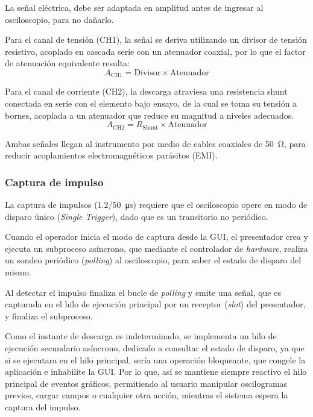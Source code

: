 La señal eléctrica, debe ser adaptada en amplitud antes de ingresar al osciloscopio, para no dañarlo.

Para el canal de tensión (CH1), la señal se deriva utilizando un divisor de tensión resistivo, acoplado en cascada serie con un atenuador coaxial, por lo que el factor de atenuación equivalente resulta:
\begin{equation}
    A_{\text{CH1}} = \text{Divisor} \times \text{Atenuador}
    \label{eq:atenuacion_tension}
\end{equation}

Para el canal de corriente (CH2), la descarga atraviesa una resistencia shunt conectada en serie con el elemento bajo ensayo, de la cual se toma su tensión a bornes, acoplada a un atenuador que reduce su magnitud a niveles adecuados.
\begin{equation}
    A_{\text{CH2}} = R_\text{Shunt} \times \text{Atenuador}
    \label{eq:atenuacion_corriente}
\end{equation}

Ambas señales llegan al instrumento por medio de cables coaxiales de \qty{50}{\ohm}, para reducir acoplamientos electromagnéticos parásitos (EMI).

\subsubsection{Captura de impulso}
\label{subsec:captura_impulso}

La captura de impulsos (\qty[parse-numbers=false]{1.2/50}{\micro\second}) requiere que el osciloscopio opere en modo de disparo único (\emph{Single Trigger}), dado que es un transitorio no periódico.

Cuando el operador inicia el modo de captura desde la GUI, el presentador crea y ejecuta un subproceso asíncrono, que mediante el controlador de \emph{hardware}, realiza un sondeo periódico (\emph{polling}) al osciloscopio, para saber el estado de disparo del mismo.

Al detectar el impulso finaliza el bucle de \emph{polling} y emite una señal, que es capturada en el hilo de ejecución principal por un receptor (\emph{slot}) del presentador, y finaliza el subproceso.

Como el instante de descarga es indeterminado, se implementa un hilo de ejecución secundario asíncrono, dedicado a consultar el estado de disparo, ya que si se ejecutara en el hilo principal, sería una operación bloqueante, que congele la aplicación e inhabilite la GUI. Por lo que, así se mantiene siempre reactivo el hilo principal de eventos gráficos, permitiendo al usuario manipular oscilogramas previos, cargar campos o cualquier otra acción, mientras el sistema espera la captura del impulso.

